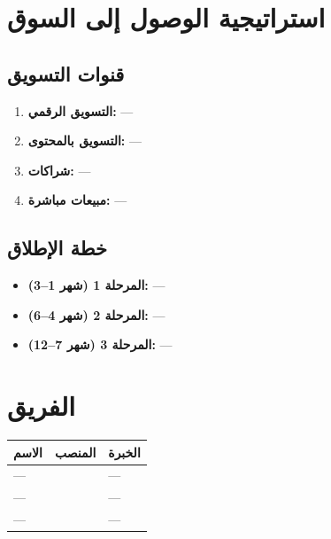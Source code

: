 \documentclass[11pt,a4paper]{article}
\begin{document}
\section{استراتيجية الوصول إلى السوق}
\label{sec:gtm}

\subsection{قنوات التسويق}
\begin{enumerate}
    \item \textbf{التسويق الرقمي:} ---
    \item \textbf{التسويق بالمحتوى:} ---
    \item \textbf{شراكات:} ---
    \item \textbf{مبيعات مباشرة:} ---
\end{enumerate}

\subsection{خطة الإطلاق}
\begin{itemize}
    \item \textbf{المرحلة 1 (شهر 1--3):} ---
    \item \textbf{المرحلة 2 (شهر 4--6):} ---
    \item \textbf{المرحلة 3 (شهر 7--12):} ---
\end{itemize}

\section{الفريق}
\label{sec:team}

\begin{table}[H]
\centering
\renewcommand{\arraystretch}{1.4}
\begin{tabularx}{\textwidth}{L{4cm} L{4cm} X}
\toprule
\textbf{الاسم} & \textbf{المنصب} & \textbf{الخبرة} \\
\midrule
--- &  & --- \\
--- &  & --- \\
--- &  & --- \\
\bottomrule
\end{tabularx}
\end{table}
\end{document}
